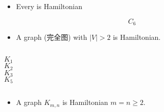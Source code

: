 
\begin{frame}{}
\end{frame}

\begin{frame}{}
  \begin{exampleblock}{}
    \begin{itemize}
      \item Every  is Hamiltonian
    \end{itemize}
  \end{exampleblock}

  \vspace{0.60cm}
  \[
    C_{6}
  \]
\end{frame}

\begin{frame}{}
  \begin{exampleblock}{}
    \begin{itemize}
      \item A  graph (完全图) with $|V| > 2$ is Hamiltonian.
    \end{itemize}
  \end{exampleblock}

  \pause
  \vspace{0.60cm}
  \begin{columns}
      \[
        K_{1}
      \]
      \[
        K_{2}
      \]
      \[
        K_{3}
      \]
      \[
        K_{5}
      \]
  \end{columns}
\end{frame}

\begin{frame}{}
  \begin{exampleblock}{}
    \begin{itemize}
      \item A  graph $K_{m, n}$ is Hamiltonian
         $m = n \ge 2$.
    \end{itemize}
  \end{exampleblock}
\end{frame}

